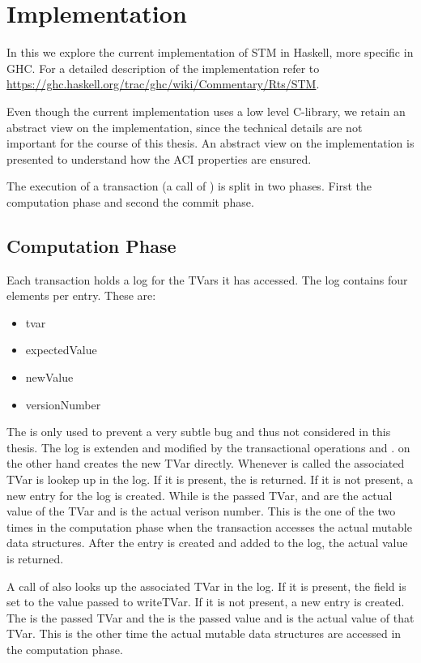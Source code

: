   
\section{Implementation}
In this we explore the current implementation of STM in Haskell, more specific in GHC. For a detailed description of the implementation 
refer to \url{https://ghc.haskell.org/trac/ghc/wiki/Commentary/Rts/STM}. 

Even though the current implementation uses a low level C-library, we retain an abstract view on the implementation, since the technical 
details are not important for the course of this thesis. An abstract view on the implementation is presented to understand how the ACI 
properties are ensured.

The execution of a transaction (a call of ) is split in two phases. First the computation phase and second the commit phase. 
 
\subsection{Computation Phase}
Each transaction holds a log for the TVars it has accessed. The log contains four elements per entry. These are: 
\begin{itemize}
 \item tvar
 \item expectedValue
 \item newValue
 \item versionNumber
\end{itemize}
The  is only used to prevent a very subtle bug and thus not considered in this thesis. 
The log is extenden and modified by the transactional operations  and .  on 
the other hand creates the new TVar directly. Whenever  is called the associated TVar is lookep up in the log.
If it is present, the  is returned. If it is not present, a new entry for the log is created. While 
is the passed TVar,  and  are the actual value of the TVar and  is 
the actual verison number.
This is the one of the two times in the computation phase when the transaction accesses the actual mutable data structures.  
After the entry is created and added to the log, the actual value is returned. 

A call of  also looks up the associated TVar in the log. If it is present, the field  is 
set to the value passed to writeTVar. If it is not present, a new entry is created. The  is the passed TVar and
the  is the passed value and  is the actual value of that TVar. This is the other time 
the actual mutable data structures are accessed in the computation phase. 

